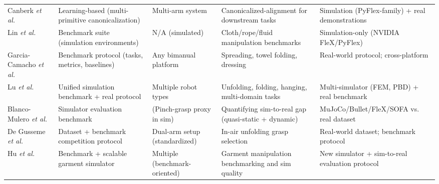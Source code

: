 \begin{table}[htb]
\begin{tabular}{p{} p{} p{} p{} p{}}
    Canberk \emph{et al.}~\cite{Canberk2022ClothFunnels} & Learning-based (multi-primitive canonicalization) & Multi-arm system & Canonicalized-alignment for downstream tasks & Simulation (PyFlex-family) + real demonstrations \\
    Lin \emph{et al.}~\cite{Lin2021SoftGym} & Benchmark suite (simulation environments) & N/A (simulated) & Cloth/rope/fluid manipulation benchmarks & Simulation-only (NVIDIA FleX/PyFlex) \\
    Garcia-Camacho \emph{et al.}~\cite{GarciaCamacho2020ClothBenchmark} & Benchmark protocol (tasks, metrics, baselines) & Any bimanual platform & Spreading, towel folding, dressing & Real-world protocol; cross-platform \\
    Lu \emph{et al.}~\cite{Lu2024GarmentLab} & Unified simulation benchmark + real protocol & Multiple robot types & Unfolding, folding, hanging, multi-domain tasks & Multi-simulator (\ac{FEM}, \ac{PBD}) + real benchmark \\
    Blanco-Mulero \emph{et al.}~\cite{BlancoMulero2024Sim2RealGap} & Simulator evaluation benchmark & (Pinch-grasp proxy in sim) & Quantifying sim-to-real gap (quasi-static + dynamic) & MuJoCo/Bullet/FleX/SOFA vs. real dataset \\
    De Gusseme \emph{et al.}~\cite{DeGusseme2026ClothCompetition} & Dataset + benchmark competition protocol & Dual-arm setup (standardized) & In-air unfolding grasp selection & Real-world dataset; benchmark protocol \\
    Hu \emph{et al.}~\cite{Hu2025RGBench} & Benchmark + scalable garment simulator & Multiple (benchmark-oriented) & Garment manipulation benchmarking and sim quality & New simulator + sim-to-real evaluation protocol \\
    \hline
    \end{tabular}
\end{table}

